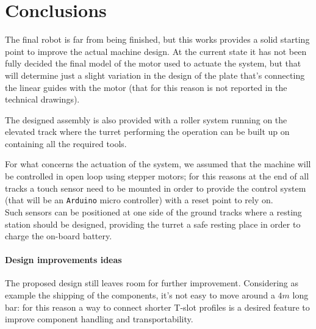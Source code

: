 \section{Conclusions}
	The final robot is far from being finished, but this works provides a solid starting point to improve the actual machine design. At the current state it has not been fully decided the final model of the motor used to actuate the system, but that will determine just a slight variation in the design of the plate that's connecting the linear guides with the motor (that for this reason is not reported in the technical drawings).
	
	The designed assembly is also provided with a roller system running on the elevated track where the turret performing the operation can be built up on containing all the required tools.
	
	For what concerns the actuation of the system, we assumed that the machine will be controlled in open loop using stepper motors; for this reasons at the end of all tracks a touch sensor need to be mounted in order to provide the control system (that will be an \texttt{Arduino} micro controller) with a reset point to rely on. \\
	Such sensors can be positioned at one side of the ground tracks where a resting station should be designed, providing the turret a safe resting place in order to charge the on-board battery.
	
	\paragraph{Design improvements ideas} The proposed design still leaves room for further improvement. Considering as example the shipping of the components, it's not easy to move around a $4m$ long bar: for this reason a way to connect shorter T-slot profiles is a desired feature to improve component handling and transportability.